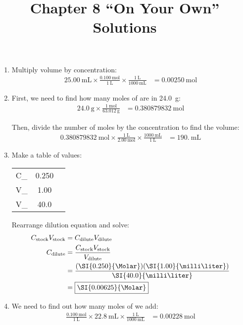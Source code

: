 \documentclass[11pt,letterpaper]{article}
\title{Chapter 8 ``On Your Own'' Solutions}
\begin{document}
\begin{center}
	\bfseries
	\Large
	\thetitle
\end{center}

\begin{enumerate}[itemsep=2em,leftmargin=0pt,label=\textbf{\Alph*.}]
	\item Multiply volume by concentration:
		\begin{align*}
			\SI{25.00}{\milli\liter} \times
			\frac{\SI{0.100}{\mole}}{\SI{1}{\liter}} \times
			\frac{\SI{1}{\liter}}{\SI{1000}{\milli\liter}} &=
			\boxed{\SI{0.00250}{\mole}}
		\end{align*}

	\item First, we need to find how many moles of  are in
		\SI{24.0}{\gram}:
		\begin{align*}
			\SI{24.0}{\gram} \times
			\frac{\SI{1}{\mole}}{\SI{63.012}{\gram}} &=
			\SI{0.380879832}{\mole}
		\end{align*}

		Then, divide the number of moles by the concentration to find
		the volume:
		\begin{align*}
			\SI{0.380879832}{\mole} \times
			\frac{\SI{1}{\liter}}{\SI{2.00}{\mole}} \times
			\frac{\SI{1000}{\milli\liter}}{\SI{1}{\liter}} &=
			\boxed{\SI{190.}{\milli\liter}}
		\end{align*}
		
	\item Make a table of values:

		\begin{tabular} {L S[table-format=2.3] s}
			C_ & 0.250 & \Molar \\
			V_ & 1.00 & \milli\liter \\
			V_ & 40.0 & \milli\liter
		\end{tabular}

		Rearrange dilution equation and solve:
		\begin{align*}
			C_\text{stock}V_\text{stock} &=
			C_\text{dilute}V_\text{dilute} \\
			C_\text{dilute} &=
			\frac{C_\text{stock}V_\text{stock}}{V_\text{dilute}} \\
			&=
			\frac{(\SI{0.250}{\Molar})(\SI{1.00}{\milli\liter})}{\SI{40.0}{\milli\liter}}
			\\
			&= \boxed{\SI{0.00625}{\Molar}}
		\end{align*}

	\item We need to find out how many moles of  we add:
		\begin{align*}
			\frac{\SI{0.100}{\mole}}{\SI{1}{\liter}} \times
			\SI{22.8}{\milli\liter} \times
			\frac{\SI{1}{\liter}}{\SI{1000}{\milli\liter}} &=
			\SI{0.00228}{\mole}
		\end{align*}


\end{enumerate}
\end{document}
